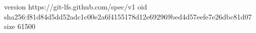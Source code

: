 version https://git-lfs.github.com/spec/v1
oid sha256:f81d84d5dd52adc1c00e2a6f4155178d12e692969bed4d57eefe7e26dbc81d07
size 61500
